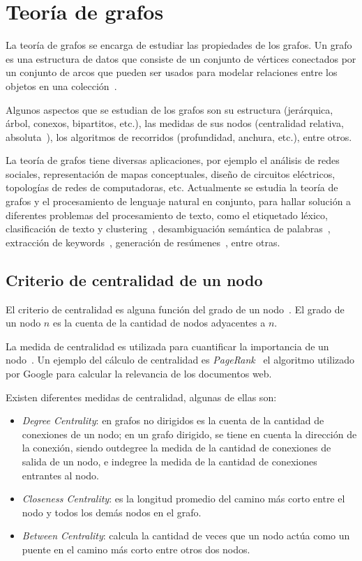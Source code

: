 \section{Teoría de grafos}
La teoría de grafos se encarga de estudiar las propiedades de los grafos. Un grafo es una estructura de datos que consiste de un conjunto de vértices conectados por un conjunto de arcos que pueden ser usados para modelar relaciones entre los objetos en una colección~\cite{mihalcea2011graph}.

Algunos aspectos que se estudian de los grafos son su estructura (jerárquica, árbol, conexos, bipartitos, etc.), las medidas de sus nodos (centralidad relativa, absoluta~\cite{freeman1978centrality}), los algoritmos de recorridos (profundidad, anchura, etc.), entre otros.

La teoría de grafos tiene diversas aplicaciones, por ejemplo el análisis de redes sociales, representación de mapas conceptuales, diseño de circuitos eléctricos, topologías de redes de computadoras, etc. Actualmente se estudia la teoría de grafos y el procesamiento de lenguaje natural en conjunto, para hallar solución a diferentes problemas del procesamiento de texto, como el etiquetado léxico, clasificación de texto y clustering~\cite{mihalcea2011graph}, desambiguación semántica de palabras~\cite{MihalceaSinhaDisambiguation}\cite{ArabJahromiDisambiguation}, extracción de keywords~\cite{Litvak:2008:GKE:1613172.1613178}\cite{beliga2015overview}, generación de resúmenes~\cite{plaza2011uso}, entre otras.

\subsection{Criterio de centralidad de un nodo}
El criterio de centralidad es alguna función del grado de un nodo~\cite{freeman1978centrality}. El grado de un nodo $n$ es la cuenta de la cantidad de nodos adyacentes a $n$. 

La medida de centralidad es utilizada para cuantificar la importancia de un nodo~\cite{2018transfer}. Un ejemplo del cálculo de centralidad es \emph{PageRank}~\cite{page1999pagerank} el algoritmo utilizado por Google para calcular la relevancia de los documentos web.

Existen diferentes medidas de centralidad, algunas de ellas son:
\begin{itemize}
    \item \emph{Degree Centrality}: en grafos no dirigidos es la cuenta de la cantidad de conexiones de un nodo; en un grafo dirigido, se tiene en cuenta la dirección de la conexión, siendo outdegree la medida de la cantidad de conexiones de salida de un nodo, e indegree la medida de la cantidad de conexiones entrantes al nodo. 
    \item \emph{Closeness Centrality}: es la longitud promedio del camino más corto entre el nodo y todos los demás nodos en el grafo.
    \item \emph{Between Centrality}: calcula la cantidad de veces que un nodo actúa como un puente en el camino más corto entre otros dos nodos.
\end{itemize}

